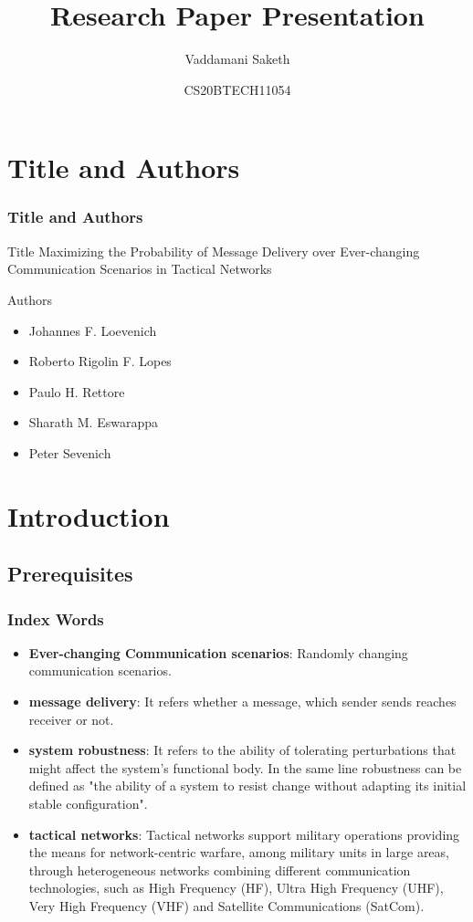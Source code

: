 \documentclass{beamer}
\title{Research Paper Presentation}
\institute{IITH}
\date{CS20BTECH11054}
\author{Vaddamani Saketh}
\begin{document}
\begin{frame}
\titlepage
\end{frame}
\section{Title and Authors}
\begin{frame}
\frametitle{Title and Authors}
\begin{block}{Title}
Maximizing the Probability of Message Delivery over Ever-changing Communication Scenarios in Tactical Networks

\end{block}
\begin{block}{Authors}
\begin{itemize}
    \item Johannes F. Loevenich
    \item Roberto Rigolin F. Lopes
    \item Paulo H. Rettore
    \item Sharath M. Eswarappa
    \item Peter Sevenich
\end{itemize}

\end{block}
\end{frame}
\section{\textbf{Introduction}}
\subsection*{Prerequisites}
\begin{frame}[fragile]
\frametitle{Index Words}
\begin{block}{}
\begin{itemize}
    \item \textbf{Ever-changing Communication scenarios}: Randomly changing communication scenarios.  
    \item \textbf{message delivery}: It refers whether a message, which sender sends reaches receiver or not. 
    \item \textbf{system robustness}: It refers to the ability of tolerating perturbations that might affect the system’s functional body. In the same line robustness can be defined as "the ability of a system to resist change without adapting its initial stable configuration".
    \item \textbf{tactical networks}:  Tactical networks support military operations providing the means for network-centric warfare, among military units in large areas, through heterogeneous networks combining different communication technologies, such as High Frequency (HF), Ultra High Frequency (UHF), Very High Frequency (VHF) and Satellite Communications (SatCom).
\end{itemize}
\end{block}
\end{frame}
\end{document}
